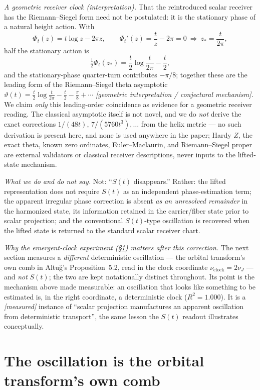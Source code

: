 \documentclass[11pt]{article}
\theoremstyle{definition}
\begin{document}
\emph{A geometric receiver clock (interpretation).} That the reintroduced scalar receiver has the
Riemann--Siegel form need not be postulated: it is the stationary phase of a natural height action. With
\[
  \Phi_t(z)=t\log z-2\pi z,\qquad \Phi_t'(z)=\frac{t}{z}-2\pi=0\ \Rightarrow\ z_*=\frac{t}{2\pi},
\]
half the stationary action is
\[
  \tfrac12\Phi_t(z_*)=\frac t2\log\frac{t}{2\pi}-\frac t2,
\]
and the stationary-phase quarter-turn contributes $-\pi/8$; together these are the leading form of the
Riemann--Siegel theta asymptotic
$\vartheta(t)=\tfrac t2\log\tfrac{t}{2\pi}-\tfrac t2-\tfrac\pi8+\cdots$
\emph{[geometric interpretation / conjectural mechanism].} We claim \emph{only} this leading-order coincidence
as evidence for a geometric receiver reading. The classical asymptotic itself is not novel, and we do
\emph{not} derive the exact corrections $1/(48t),\,7/(5760t^3),\dots$ from the helix metric --- no such
derivation is present here, and none is used anywhere in the paper; Hardy $Z$, the exact theta, known zero
ordinates, Euler--Maclaurin, and Riemann--Siegel proper are external validators or classical receiver
descriptions, never inputs to the lifted-state mechanism.

\emph{What we do and do not say.} Not: ``$S(t)$ disappears.'' Rather: the lifted representation does not
require $S(t)$ as an independent phase-estimation term; the apparent irregular phase correction is absent
\emph{as an unresolved remainder} in the harmonized state, its information retained in the carrier/fiber state
prior to scalar projection; and the conventional $S(t)$-type oscillation is recovered when the lifted state is
returned to the standard scalar receiver chart.

\emph{Why the emergent-clock experiment (\S\ref{sec:comb}) matters after this correction.} The next section
measures a \emph{different} deterministic oscillation --- the orbital transform's own comb in Altu\u{g}'s
Proposition~5.2, read in the clock coordinate $\nu_{\mathrm{clock}}=2\nu_J$ --- and \emph{not} $S(t)$; the two
are kept notationally distinct throughout. Its point is the mechanism above made measurable: an oscillation
that looks like something to be estimated is, in the right coordinate, a deterministic clock ($R^2=1.000$). It
is a \emph{[measured]} instance of ``scalar projection manufactures an apparent oscillation from deterministic
transport'', the same lesson the $S(t)$ readout illustrates conceptually.

\section{The oscillation is the orbital transform's own comb}\label{sec:comb}
\end{document}
